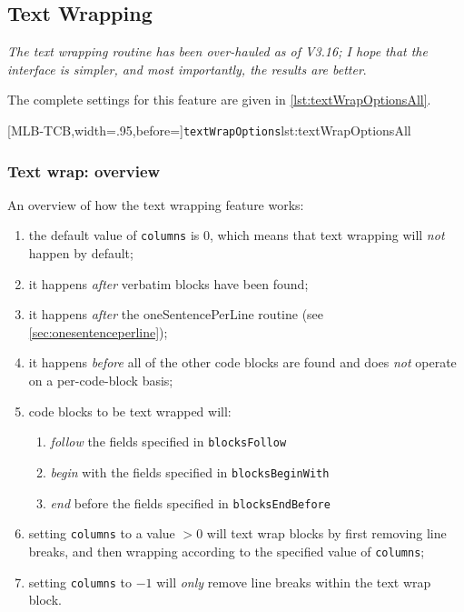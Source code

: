 \subsection{Text Wrapping}\label{subsec:textwrapping}
 \emph{The text wrapping routine has been over-hauled as
 of V3.16; I hope that the interface is simpler, and most importantly, the results are
 better}.

 The complete settings for this feature are given in \cref{lst:textWrapOptionsAll}.

 [MLB-TCB,width=.95\linewidth,before=\centering]{\texttt{textWrapOptions}}{lst:textWrapOptionsAll}

\subsubsection{Text wrap: overview}
 An overview of how the text wrapping feature works:
 \begin{enumerate}
  \item the default value of \texttt{columns} is 0, which means that text wrapping will
        \emph{not} happen by default;
  \item it happens \emph{after} verbatim blocks have been found;
  \item it happens \emph{after} the oneSentencePerLine routine (see
        \cref{sec:onesentenceperline});
  \item it happens \emph{before} all of the other code blocks are found and does \emph{not}
        operate on a per-code-block basis;
  \item code blocks to be text wrapped will:
        \begin{enumerate}
         \item \emph{follow} the fields specified in \texttt{blocksFollow}
         \item \emph{begin} with the fields specified in \texttt{blocksBeginWith}
         \item \emph{end} before the fields specified in \texttt{blocksEndBefore}
        \end{enumerate}
  \item setting \texttt{columns} to a value $>0$ will text wrap blocks by first removing line
        breaks, and then wrapping according to the specified value of \texttt{columns};
  \item setting \texttt{columns} to $-1$ will \emph{only} remove line breaks within the text wrap
        block.
 \end{enumerate}

